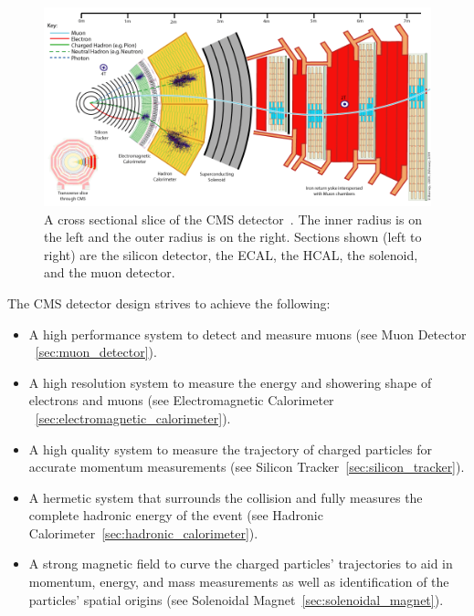 		
\begin{figure}[h]
\begin{center}
\includegraphics[width=0.9\linewidth]{Figs/CMS_Slice.png}
\caption{\label{fig:cms_slice}
A cross sectional slice of the CMS detector~\cite{cmspublic}. The inner radius is on the left and the outer radius is on the right. Sections shown (left to right) are the silicon detector, the ECAL, the HCAL, the solenoid, and the muon detector.
}
\end{center}
\end{figure} 

The CMS detector design strives to achieve the following:
\begin{itemize}
\item A high performance system to detect and measure muons (see Muon Detector ~\ref{sec:muon_detector}).
\item A high resolution system to measure the energy and showering shape of electrons and muons (see Electromagnetic Calorimeter ~\ref{sec:electromagnetic_calorimeter}).
\item A high quality system to measure the trajectory of charged particles for accurate momentum measurements (see Silicon Tracker~\ref{sec:silicon_tracker}).
\item A hermetic system that surrounds the collision and fully measures the complete hadronic energy of the event (see Hadronic Calorimeter~\ref{sec:hadronic_calorimeter}).
\item A strong magnetic field to curve the charged particles' trajectories to aid in momentum, energy, and mass measurements as well as identification of the particles' spatial origins (see Solenoidal Magnet~\ref{sec:solenoidal_magnet}).
\end{itemize}

